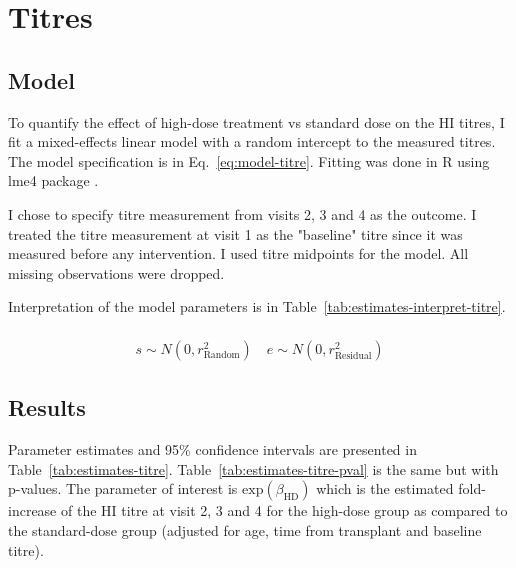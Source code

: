 \documentclass[11pt]{article}
\begin{document}
\section{Titres}

\subsection{Model}

To quantify the effect of high-dose treatment vs standard dose on the
HI titres, I fit a mixed-effects linear model with a random intercept
to the measured titres.
The model specification is in Eq.~\ref{eq:model-titre}.
Fitting was done in R \cite{R} using lme4 package \cite{lme4}.

I chose to specify titre measurement from visits 2, 3 and 4 as the outcome.
I treated the titre measurement at visit 1 as the "baseline" titre since
it was measured before any intervention. I used titre midpoints for the model.
All missing observations were dropped.

Interpretation of the model parameters is in
Table~\ref{tab:estimates-interpret-titre}.

\begin{equation}
    \begin{gathered}
        \label{eq:model-titre}
        \\
        s \sim N(0, r^2_{\text{Random}}) \quad e \sim N(0, r^2_{\text{Residual}})
    \end{gathered}
\end{equation}





\subsection{Results}

Parameter estimates and 95\% confidence intervals
are presented in Table~\ref{tab:estimates-titre}.
Table~\ref{tab:estimates-titre-pval} is the same but with p-values.
The parameter of interest is $\text{exp}(\beta_{\text{HD}})$
which is the estimated
fold-increase of the HI titre at visit 2, 3 and 4 for the high-dose group
as compared to the standard-dose group (adjusted for age, time from transplant
and baseline titre).




\end{document}
